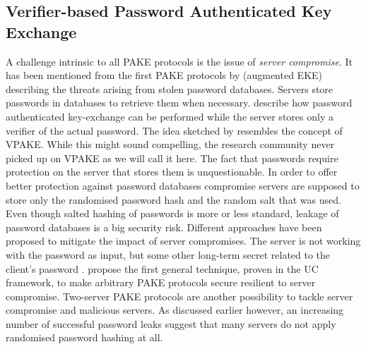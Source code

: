 \subsection{Verifier-based Password Authenticated Key Exchange}\label{sec:intro:verifier-basedPAKE}

A challenge intrinsic to all \ac{PAKE} protocols is the issue of \emph{server compromise}.
It has been mentioned from the first PAKE protocols by \citet{BellovinM93} (augmented EKE) describing the threats arising from stolen password databases.
Servers store passwords in databases to retrieve them when necessary.
\citet{BellovinM93} describe how password authenticated key-exchange can be performed while the server stores only a verifier of the actual password.
The idea sketched by \citet{BellovinM93} resembles the concept of \ac{VPAKE}.
While this might sound compelling, the research community never picked up on \ac{VPAKE} as we will call it here.
The fact that passwords require protection on the server that stores them is unquestionable.
In order to offer better protection against password databases compromise servers are supposed to store only the randomised password hash and the random salt that was used.
Even though salted hashing of passwords is more or less standard, leakage of password databases is a big security risk.
Different approaches have been proposed to mitigate the impact of server compromises.
The server is not working with the password as input, but some other long-term secret related to the client's password \cite{Wu1998,Boyen2009a}.
\citet{Gentry2006} propose the first general technique, proven in the \ac{UC} framework, to make arbitrary \ac{PAKE} protocols secure resilient to server compromise.
Two-server \ac{PAKE} protocols are another possibility to tackle server compromise and malicious servers.
As discussed earlier however, an increasing number of successful password leaks suggest that many servers do not apply randomised password hashing at all. 



